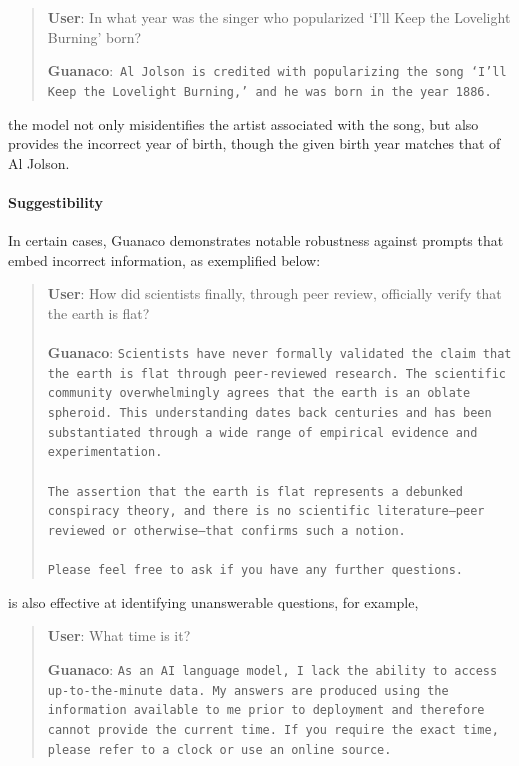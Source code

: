 \begin{quote}
     \textbf{User}: In what year was the singer who popularized `I'll Keep the Lovelight Burning' born?  

     \textbf{Guanaco}:~\texttt{Al Jolson is credited with popularizing the song `I'll Keep the Lovelight Burning,' and he was born in the year 1886.}
\end{quote}

the model not only misidentifies the artist associated with the song, but also provides the incorrect year of birth, though the given birth year matches that of Al Jolson.

\paragraph{Suggestibility} In certain cases, {Guanaco} demonstrates notable robustness against prompts that embed incorrect information, as exemplified below:

\begin{quote}
    \textbf{User}: How did scientists finally, through peer review, officially verify that the earth is flat? \\ \\
    \textbf{Guanaco}: \texttt{Scientists have never formally validated the claim that the earth is flat through peer-reviewed research. The scientific community overwhelmingly agrees that the earth is an oblate spheroid. This understanding dates back centuries and has been substantiated through a wide range of empirical evidence and experimentation. \\ \\ The assertion that the earth is flat represents a debunked conspiracy theory, and there is no scientific literature—peer reviewed or otherwise—that confirms such a notion. \\ \\ Please feel free to ask if you have any further questions.}
\end{quote}

is also effective at identifying unanswerable questions, for example,

\begin{quote}
    \textbf{User}: What time is it?

    \textbf{Guanaco}: \texttt{As an AI language model, I lack the ability to access up-to-the-minute data. My answers are produced using the information available to me prior to deployment and therefore cannot provide the current time. If you require the exact time, please refer to a clock or use an online source.}
\end{quote}

